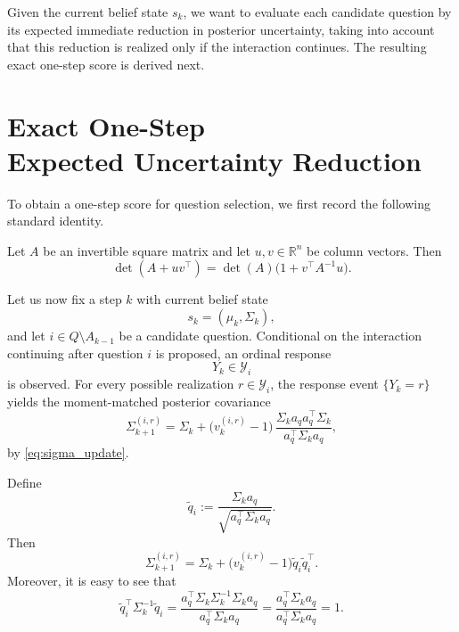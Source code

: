 \documentclass{article}
\begin{document}
Given the current belief state $s_k$, we want to evaluate each candidate question
by its expected immediate reduction in posterior uncertainty, taking into account that
this reduction is realized only if the interaction continues. The resulting exact
one-step score is derived next.

\section[Exact One-Step Expected Uncertainty Reduction]{Exact One-Step \\Expected Uncertainty Reduction}\label{sec:exact}

To obtain a one-step score for question selection, we first record the following standard identity.

\begin{lemma}
Let $A$ be an invertible square matrix and let $u,v \in \mathbb{R}^n$ be column vectors. Then
\begin{equation}
\det(A+uv^\top)= \det(A)\bigl(1+v^\top A^{-1}u\bigr).
\label{eq:matrix_det_lemma}
\end{equation}
\end{lemma}

Let us now fix a step $k$ with current belief state
\begin{equation*}
s_k=(\mu_k,\Sigma_k),
\end{equation*}
and let $i\in Q\setminus A_{k-1}$ be a candidate question. Conditional on the interaction
continuing after question $i$ is proposed, an ordinal response
\begin{equation*}
Y_k \in \mathcal Y_i
\end{equation*}
is observed. For every possible realization $r\in\mathcal Y_i$, the response event
$\{Y_k=r\}$ yields the moment-matched posterior covariance
\begin{equation*}
\Sigma_{k+1}^{(i,r)}
=
\Sigma_k
+
\bigl(v_k^{(i,r)}-1\bigr)\,
\frac{\Sigma_k a_q a_q^\top \Sigma_k}{a_q^\top \Sigma_k a_q},
\end{equation*}
by \eqref{eq:sigma_update}.

Define
\begin{equation*}
\tilde q_i:=\frac{\Sigma_k a_q}{\sqrt{a_q^\top\Sigma_k a_q}}.
\end{equation*}
Then
\begin{equation*}
\Sigma_{k+1}^{(i,r)}
=
\Sigma_k+\bigl(v_k^{(i,r)}-1\bigr)\tilde q_i\tilde q_i^\top.
\end{equation*}
Moreover, it is easy to see that
\begin{equation}
\tilde q_i^\top \Sigma_k^{-1}\tilde q_i
=
\frac{a_q^\top \Sigma_k \Sigma_k^{-1}\Sigma_k a_q}{a_q^\top\Sigma_k a_q}
=
\frac{a_q^\top\Sigma_k a_q}{a_q^\top\Sigma_k a_q}
=
1.
\label{eq:q_norm_identity}
\end{equation}
\end{document}

